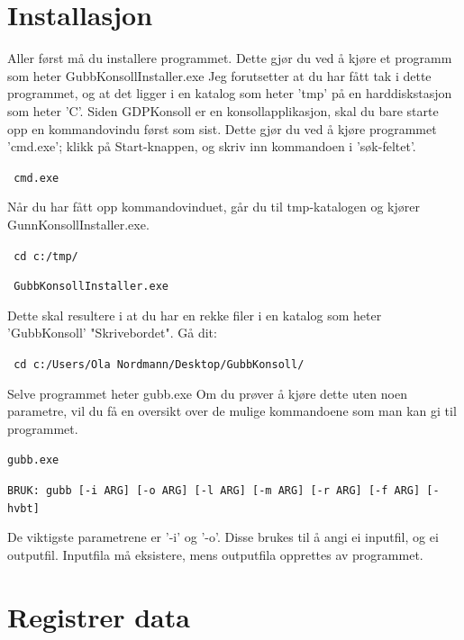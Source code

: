 \documentclass[12pt]{book}
\begin{document}
\newpage

\section{Installasjon}

Aller først må du installere programmet. Dette gjør du ved å kjøre et programm som heter GubbKonsollInstaller.exe Jeg forutsetter at du har fått tak i dette programmet, og at det ligger i en katalog som heter 'tmp' på en harddiskstasjon som heter 'C'. Siden GDPKonsoll er en konsollapplikasjon, skal du bare starte opp en kommandovindu først som sist. Dette gjør du ved å kjøre programmet 'cmd.exe'; klikk på Start-knappen, og skriv inn kommandoen i 'søk-feltet'.

\begin{alltt}
\texttt{ cmd.exe  {\Return} }
\end{alltt}

Når du har fått opp kommandovinduet, går du til tmp-katalogen og kjører GunnKonsollInstaller.exe.

\begin{alltt}
\texttt{ cd c:/tmp/  {\Return} }

\texttt{ GubbKonsollInstaller.exe  {\Return} }
\end{alltt}

Dette skal resultere i at du har en rekke filer i en katalog som heter  'GubbKonsoll'  "Skrivebordet". Gå dit:

\begin{alltt}
\texttt{ cd c:/Users/Ola Nordmann/Desktop/GubbKonsoll/  {\Return} }
\end{alltt}

Selve programmet heter gubb.exe Om du prøver å kjøre dette uten noen parametre, vil du få en oversikt over de mulige kommandoene som man kan gi til programmet.

\begin{alltt}
\texttt{gubb.exe  {\Return} }

\texttt{BRUK: gubb [-i ARG] [-o ARG] [-l ARG] [-m ARG] [-r ARG] [-f ARG] [-hvbt]  }
\end{alltt}

De viktigste parametrene er '-i' og '-o'. Disse brukes til å angi ei inputfil, og ei outputfil. Inputfila må eksistere, mens outputfila opprettes av programmet.


\newpage

\section{Registrer data}
\end{document}
